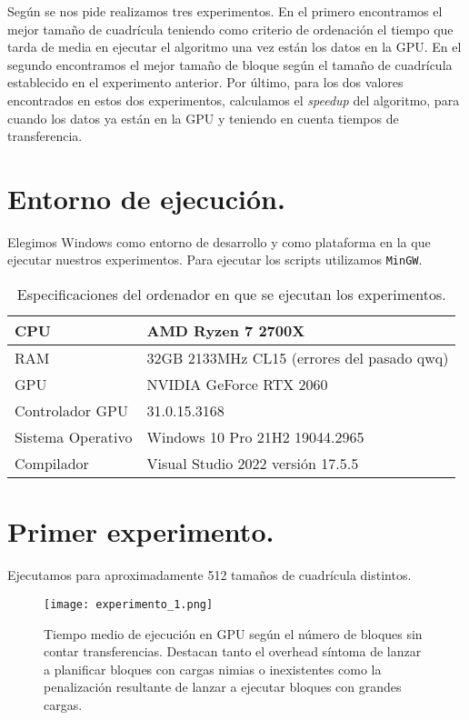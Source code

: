 Según se nos pide realizamos tres experimentos. En el primero encontramos el mejor tamaño de cuadrícula
teniendo como criterio de ordenación el tiempo que tarda de media en ejecutar el algoritmo una vez
están los datos en la GPU. En el segundo encontramos el mejor tamaño de bloque según el tamaño de cuadrícula
establecido en el experimento anterior. Por último, para los dos valores encontrados en estos dos experimentos,
calculamos el \textit{speedup} del algoritmo, para cuando los datos ya están en la GPU y teniendo en cuenta tiempos
de transferencia.

\section{Entorno de ejecución.}

Elegimos Windows como entorno de desarrollo y como plataforma en la que ejecutar nuestros experimentos.
Para ejecutar los scripts utilizamos \texttt{MinGW}.

\begin{table}[H]
    \centering
    \begin{tabular}{|l|l|}
    \hline
    CPU               & AMD Ryzen 7 2700X                 \\ \hline
    RAM               & 32GB 2133MHz CL15 (errores del pasado qwq) \\ \hline
    GPU               & NVIDIA GeForce RTX 2060           \\ \hline
    Controlador GPU   & 31.0.15.3168                      \\ \hline
    Sistema Operativo & Windows 10 Pro 21H2 19044.2965    \\ \hline
    Compilador        & Visual Studio 2022 versión 17.5.5 \\ \hline
    \end{tabular}
    \caption{Especificaciones del ordenador en que se ejecutan los experimentos.}
\end{table}

\section{Primer experimento.}

Ejecutamos para aproximadamente 512 tamaños de cuadrícula distintos.

\begin{figure}[H]
    \centering
    \texttt{[image: experimento\_1.png]}
    \caption{Tiempo medio de ejecución en GPU según el número de bloques sin contar transferencias.
    Destacan tanto el overhead síntoma de lanzar a planificar bloques con cargas nimias o inexistentes
    como la penalización resultante de lanzar a ejecutar bloques con grandes cargas.}
\end{figure}

